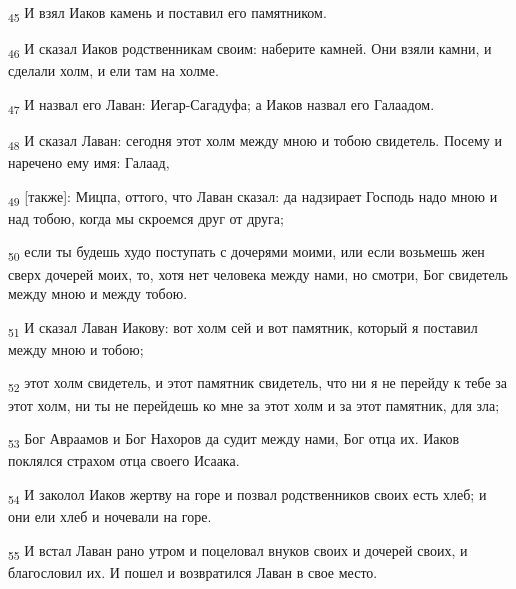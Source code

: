 \begin{tcolorbox}
\textsubscript{45} И взял Иаков камень и поставил его памятником.
\end{tcolorbox}
\begin{tcolorbox}
\textsubscript{46} И сказал Иаков родственникам своим: наберите камней. Они взяли камни, и сделали холм, и ели там на холме.
\end{tcolorbox}
\begin{tcolorbox}
\textsubscript{47} И назвал его Лаван: Иегар-Сагадуфа; а Иаков назвал его Галаадом.
\end{tcolorbox}
\begin{tcolorbox}
\textsubscript{48} И сказал Лаван: сегодня этот холм между мною и тобою свидетель. Посему и наречено ему имя: Галаад,
\end{tcolorbox}
\begin{tcolorbox}
\textsubscript{49} [также]: Мицпа, оттого, что Лаван сказал: да надзирает Господь надо мною и над тобою, когда мы скроемся друг от друга;
\end{tcolorbox}
\begin{tcolorbox}
\textsubscript{50} если ты будешь худо поступать с дочерями моими, или если возьмешь жен сверх дочерей моих, то, хотя нет человека между нами, но смотри, Бог свидетель между мною и между тобою.
\end{tcolorbox}
\begin{tcolorbox}
\textsubscript{51} И сказал Лаван Иакову: вот холм сей и вот памятник, который я поставил между мною и тобою;
\end{tcolorbox}
\begin{tcolorbox}
\textsubscript{52} этот холм свидетель, и этот памятник свидетель, что ни я не перейду к тебе за этот холм, ни ты не перейдешь ко мне за этот холм и за этот памятник, для зла;
\end{tcolorbox}
\begin{tcolorbox}
\textsubscript{53} Бог Авраамов и Бог Нахоров да судит между нами, Бог отца их. Иаков поклялся страхом отца своего Исаака.
\end{tcolorbox}
\begin{tcolorbox}
\textsubscript{54} И заколол Иаков жертву на горе и позвал родственников своих есть хлеб; и они ели хлеб и ночевали на горе.
\end{tcolorbox}
\begin{tcolorbox}
\textsubscript{55} И встал Лаван рано утром и поцеловал внуков своих и дочерей своих, и благословил их. И пошел и возвратился Лаван в свое место.
\end{tcolorbox}

